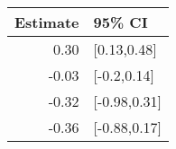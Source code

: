\begin{tabular}{rl}
  \hline
Estimate & 95\% CI \\ 
  \hline
0.30 & [0.13,0.48] \\ 
  -0.03 & [-0.2,0.14] \\ 
  -0.32 & [-0.98,0.31] \\ 
  -0.36 & [-0.88,0.17] \\ 
   \hline
\end{tabular}

